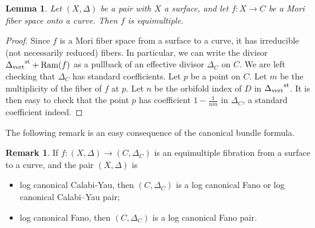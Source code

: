 \documentclass{amsart}
\newtheorem{lemma}[theorem]{Lemma}
\theoremstyle{definition}
\newtheorem{definition}[theorem]{Definition}
\newtheorem{remark}[theorem]{Remark}
\theoremstyle{remark}
\numberwithin{equation}{section}
\begin{document}

\begin{lemma}\label{lem:mfscompatible}
    Let $(X,\Delta)$ be a pair with $X$ a surface, and let $f:X\to C$ be a Mori fiber space onto a curve. Then $f$ is equimultiple.
\end{lemma}

\begin{proof}
    Since $f$ is a Mori fiber space from a surface to a curve, it has irreducible (not necessarily reduced) fibers. In particular, we can write the divisor
    ${\Delta_{\rm vert}}^{\rm st} + {\rm Ram}(f)$ as a pullback of an effective divisor $\Delta_C$ on $C$. We are left checking that $\Delta_C$ has standard coefficients.
    Let $p$ be a point on $C$. Let $m$ be the multiplicity of the fiber of $f$ at $p$. Let $n$ be the orbifold index of $D$ in ${\Delta_{\rm vert}}^{\rm st}$. It is then easy to check that the point $p$ has coefficient $1-\frac{1}{nm}$ in $\Delta_C$, a standard coefficient indeed.
\end{proof}

The following remark is an easy consequence of the canonical bundle formula.

\begin{remark}\label{rem:mfscompatible}
   If $f:(X,\Delta)\to (C,\Delta_C)$ is an equimultiple fibration from a surface to a curve, and the pair $(X,\Delta)$ is 
    \begin{itemize}
        \item log canonical Calabi-Yau, then $(C,\Delta_C)$ is a log canonical Fano or log canonical Calabi--Yau pair;
        \item log canonical Fano, then $(C,\Delta_C)$ is a log canonical Fano pair.
    \end{itemize}
\end{remark}
\end{document}
